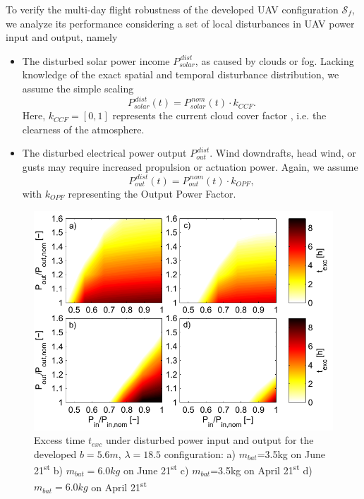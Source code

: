 To verify the multi-day flight robustness of the developed UAV configuration $\mathcal{S}_f$, we analyze its performance considering a set of local disturbances in UAV power input and output, namely
\begin{itemize}
\item The disturbed solar power income $P_{solar}^{\,dist}$, as caused by clouds or fog. Lacking knowledge of the exact spatial and temporal disturbance distribution, we assume the simple scaling
\begin{equation}
P_{solar}^{\,dist}(t) = P_{solar}^{\,nom}(t) \cdot k_{CCF}.
\end{equation}
Here, $k_{CCF}=[0,1]$  represents the current cloud cover factor \cite{Kimura_SolarRadAndClouds}, i.e. the clearness of the atmosphere.
\item The disturbed electrical power output $P_{out}^{\,dist}$. Wind downdrafts, head wind, or gusts may require increased propulsion or actuation power. Again, we assume 
\begin{equation}
P_{out}^{\,dist}(t) = P_{out}^{\,nom}(t) \cdot k_{OPF},
\end{equation}
with $k_{OPF}$ representing the Output Power Factor.
\end{itemize}
\begin{figure}
    \centering
    \includegraphics[width=\linewidth]{images/5_texcRobustness/5_texcRobustness.pdf}
    \caption{Excess time $t_{exc}$ under disturbed power input and output for the developed $b=5.6m$, $\lambda=18.5$ configuration: a) $m_{bat}$=3.5kg on June 21\textsuperscript{st} b) $m_{bat}=6.0kg$ on June 21\textsuperscript{st} c) $m_{bat}$=3.5kg on April 21\textsuperscript{st} d) $m_{bat}=6.0kg$ on April 21\textsuperscript{st} }
    \label{fig:ExcessTimeRobustness}
\end{figure}
